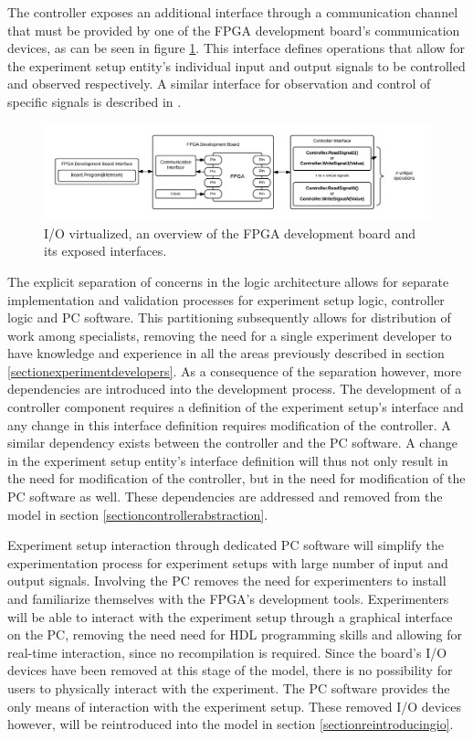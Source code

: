 \documentclass[openright]{uva-bachelor-thesis}
\begin{document}
The controller exposes an additional interface through a communication channel that must be provided by one of the FPGA development board's communication devices, as can be seen in figure \ref{fig:overview-inout}. This interface defines operations that allow for the experiment setup entity's individual input and output signals to be controlled and observed respectively. A similar interface for observation and control of specific signals is described in \cite{holland2003harnessing}. 

\begin{figure}[h]
\centering
\includegraphics[width=\textwidth]{overview-inout}
\caption{I/O virtualized, an overview of the FPGA development board and its exposed interfaces.}
\label{fig:overview-inout}
\end{figure}

The explicit separation of concerns in the logic architecture allows for separate implementation and validation processes for experiment setup logic, controller logic and PC software. This partitioning subsequently allows for distribution of work among specialists, removing the need for a single experiment developer to have knowledge and experience in all the areas previously described in section  \ref{sectionexperimentdevelopers}. As a consequence of the separation however, more dependencies are introduced into the development process. The development of a controller component requires a definition of the experiment setup's interface and any change in this interface definition requires modification of the controller. A similar dependency exists between the controller and the PC software. A change in the experiment setup entity's interface definition will thus not only result in the need for modification of the controller, but in the need for modification of the PC software as well. These dependencies are addressed and removed from the model in section \ref{sectioncontrollerabstraction}.

Experiment setup interaction through dedicated PC software will simplify the experimentation process for experiment setups with large number of input and output signals. Involving the PC removes the need for experimenters to install and familiarize themselves with the FPGA's development tools. Experimenters will be able to interact with the experiment setup through a graphical interface on the PC, removing the need need for HDL programming skills and allowing for real-time interaction, since no recompilation is required. Since the board's I/O devices have been removed at this stage of the model, there is no possibility for users to physically interact with the experiment. The PC software provides the only means of interaction with the experiment setup. These removed I/O devices however, will be reintroduced into the model in section \ref{sectionreintroducingio}.
\end{document}

